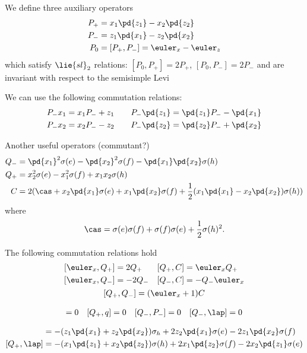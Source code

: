 \begin{appendices}
We define three auxiliary operators
\begin{align}
    P_+ & = x_1 \pd{z_1} - x_2 \pd{z_2} \\
    P_- & = z_1 \pd{x_1} - z_2 \pd{x_2} \\
    P_0 & = [P_+, P_-] = \euler_x - \euler_z
\end{align}
which satisfy $\lie{sl}_2$ relations: $[P_0, P_+] = 2P_+$, $[P_0, P_-] = 2P_-$ and are invariant with respect to the semisimple Levi %

We can use the following commutation relations:
\begin{align}
P_- x_1 & = x_1 P_- + z_1 & \quad P_- \pd{z_1} = \pd{z_1} P_- - \pd{x_1} \\
P_- x_2 & = x_2 P_- - z_2 & \quad P_- \pd{z_2} = \pd{z_2} P_- + \pd{x_2}
\end{align}

Another useful operators (commutant?)
\begin{align}
Q_- &= \pd{x_1}^2 \sigma(e) - \pd{x_2}^2 \sigma(f) - \pd{x_1}\pd{x_2} \sigma(h) \\
Q_+ &= x_2^2 \sigma(e) - x_1^2 \sigma(f) + x_1 x_2 \sigma(h) \\
C &= 2(\cas + x_2\pd{x_1} \sigma(e) + x_1\pd{x_2}\sigma(f) + \frac{1}{2}(x_1\pd{x_1} - x_2\pd{x_2})\sigma(h))
\end{align}
where
\begin{equation}
\cas = \sigma(e)\sigma(f) + \sigma(f)\sigma(e) + \frac{1}{2} \sigma(h)^2.
\end{equation}

The following commutation relations hold
\begin{gather}
    \begin{align}
        [\euler_x, Q_+] &= 2Q_+    &  [Q_+, C] &= \euler_x Q_+  \\
        [\euler_x, Q_-] &= -2Q_-   &  [Q_-, C] &= -Q_- \euler_x
    \end{align}\\
    [Q_+, Q_-] = (\euler_x + 1) C
\end{gather}

\begin{align}
[Q_+, P_+] = 0 \quad [Q_+, q] = 0 \quad [Q_-, P_-] = 0 \quad [Q_-, \lap] = 0
\end{align}

\begin{align}
    [Q_-, q] &= - (z_1\pd{x_1}+z_2\pd{x_2})\sigma_h + 2z_2\pd{x_1}\sigma(e) - 2z_1\pd{x_2}\sigma(f)  \\
    [Q_+, \lap] &= -(x_1\pd{z_1} + x_2\pd{z_2}) \sigma(h) + 2x_1\pd{z_2}\sigma(f) - 2x_2\pd{z_1}\sigma(e)
\end{align}


\end{appendices}
